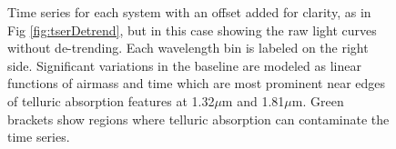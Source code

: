 \documentclass[twocolumn]{aastex6}
\begin{document}
\begin{figure}[!t]
{	\label{fig:tserPhase1821NoDetrend}
	}
	\caption{Time series for each system with an offset added for clarity, as in Fig \ref{fig:tserDetrend}, but in this case showing the raw light curves without de-trending.
	Each wavelength bin is labeled on the right side. Significant variations in the baseline are modeled as linear functions of airmass and time which are most prominent near edges of telluric absorption features at 1.32$\mu$m and 1.81$\mu$m.
	Green brackets show regions where telluric absorption can contaminate the time series.}
	\label{fig:tserNoDetrend}
\end{figure} 









\end{document}
